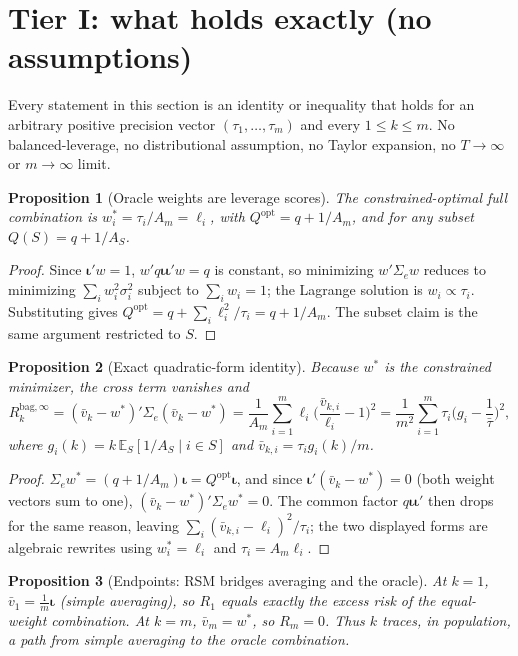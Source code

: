 \documentclass[11pt]{article}
\newcommand{\Sig}{\Sigma_e}
\newcommand{\E}{\mathbb{E}}
\newcommand{\Rk}{R_k^{\mathrm{bag},\infty}}
\newcommand{\Qopt}{Q^{\mathrm{opt}}}
\newcommand{\iotab}{\bm{\iota}}
\newtheorem{proposition}{Proposition}
\begin{document}
\section{Tier I: what holds exactly (no assumptions)}
Every statement in this section is an identity or inequality that holds for an
arbitrary positive precision vector $(\tau_1,\dots,\tau_m)$ and every $1\le k\le m$.
No balanced-leverage, no distributional assumption, no Taylor expansion, no
$T\to\infty$ or $m\to\infty$ limit.

\begin{proposition}[Oracle weights are leverage scores]\label{prop:oracle}
The constrained-optimal full combination is $w_i^\ast=\tau_i/A_m=\ell_i$, with
$\Qopt=q+1/A_m$, and for any subset $Q(S)=q+1/A_S$.
\end{proposition}
\begin{proof}
Since $\iotab'w=1$, $w'q\iotab\iotab'w=q$ is constant, so minimizing $w'\Sig w$ reduces
to minimizing $\sum_i w_i^2\sigma_i^2$ subject to $\sum_iw_i=1$; the Lagrange solution is
$w_i\propto\tau_i$. Substituting gives $\Qopt=q+\sum_i\ell_i^2/\tau_i=q+1/A_m$. The subset
claim is the same argument restricted to $S$.
\end{proof}

\begin{proposition}[Exact quadratic-form identity]\label{prop:identity}
Because $w^\ast$ is the constrained minimizer, the cross term vanishes and
\[
  \Rk=(\bar v_k-w^\ast)'\Sig(\bar v_k-w^\ast)
  =\frac{1}{A_m}\sum_{i=1}^m\ell_i\Big(\frac{\bar v_{k,i}}{\ell_i}-1\Big)^2
  =\frac{1}{m^2}\sum_{i=1}^m\tau_i\Big(g_i-\frac1{\bar\tau}\Big)^2,
\]
where $g_i(k)=k\,\E_S[1/A_S\mid i\in S]$ and $\bar v_{k,i}=\tau_i g_i(k)/m$.
\end{proposition}
\begin{proof}
$\Sig w^\ast=(q+1/A_m)\iotab=\Qopt\iotab$, and since $\iotab'(\bar v_k-w^\ast)=0$
(both weight vectors sum to one), $(\bar v_k-w^\ast)'\Sig w^\ast=0$. The common
factor $q\iotab\iotab'$ then drops for the same reason, leaving
$\sum_i(\bar v_{k,i}-\ell_i)^2/\tau_i$; the two displayed forms are algebraic rewrites
using $w_i^\ast=\ell_i$ and $\tau_i=A_m\ell_i$.
\end{proof}

\begin{proposition}[Endpoints: RSM bridges averaging and the oracle]\label{prop:endpoints}
At $k=1$, $\bar v_1=\tfrac1m\iotab$ (simple averaging), so $R_1$ equals exactly the
excess risk of the equal-weight combination. At $k=m$, $\bar v_m=w^\ast$, so $R_m=0$.
Thus $k$ traces, in population, a path from simple averaging to the oracle combination.
\end{proposition}
\end{document}
